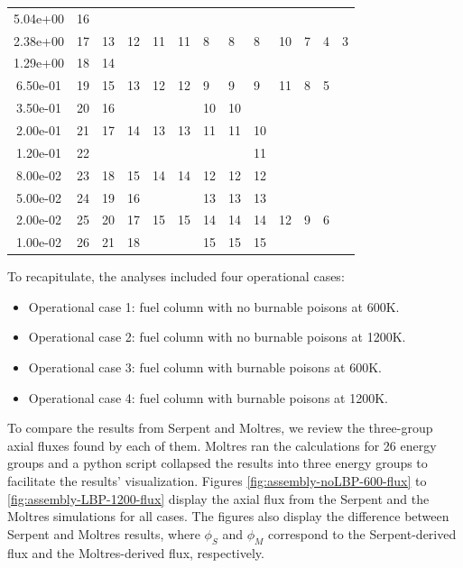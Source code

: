 \begin{table}[htbp!]
\begin{tabular}{S[table-format=2.2e-1]|llllllllllll}
  5.04e+00            & 16    &      &      &     &     &     &     &       &     &    &    &   \\ 
  2.38e+00            & 17    & 13   & 12   & 11  & 11  & 8   & 8   & 8     & 10  & 7  & 4  & 3 \\ 
  1.29e+00            & 18    & 14   &      &     &     &     &     &       &     &    &    &   \\ 
  6.50e-01            & 19    & 15   & 13   & 12  & 12  & 9   & 9   & 9     & 11  & 8  & 5  &   \\ 
  3.50e-01            & 20    & 16   &      &     &     & 10  & 10  &       &     &    &    &   \\ 
  2.00e-01            & 21    & 17   & 14   & 13  & 13  & 11  & 11  & 10    &     &    &    &   \\ 
  1.20e-01            & 22    &      &      &     &     &     &     & 11    &     &    &    &   \\ 
  8.00e-02            & 23    & 18   & 15   & 14  & 14  & 12  & 12  & 12    &     &    &    &   \\ 
  5.00e-02            & 24    & 19   & 16   &     &     & 13  & 13  & 13    &     &    &    &   \\ 
  2.00e-02            & 25    & 20   & 17   & 15  & 15  & 14  & 14  & 14    & 12  & 9  & 6  &   \\ 
  1.00e-02            & 26    & 21   & 18   &     &     & 15  & 15  & 15    &     &    &    &   \\ 
  \bottomrule
  \end{tabular}
  \label{tab:energygroups}
\end{table}

To recapitulate, the analyses included four operational cases: 
\begin{itemize}
  \item Operational case 1: fuel column with no burnable poisons at 600K.
  \item Operational case 2: fuel column with no burnable poisons at 1200K.
  \item Operational case 3: fuel column with burnable poisons at 600K.
  \item Operational case 4: fuel column with burnable poisons at 1200K.
\end{itemize}

To compare the results from Serpent and Moltres, we review the three-group axial fluxes found by each of them.
Moltres ran the calculations for 26 energy groups and a python script collapsed the results into three energy groups to facilitate the results' visualization.
Figures \ref{fig:assembly-noLBP-600-flux} to \ref{fig:assembly-LBP-1200-flux} display the axial flux from the Serpent and the Moltres simulations for all cases.
The figures also display the difference between Serpent and Moltres results, where $\phi_S$ and $\phi_M$ correspond to the Serpent-derived flux and the Moltres-derived flux, respectively. 

